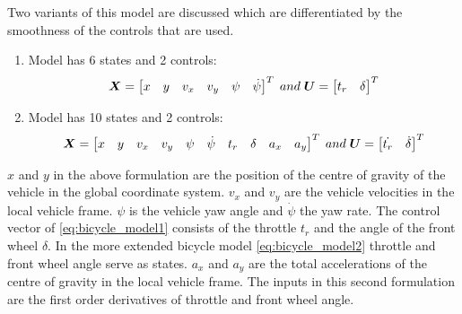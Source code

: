 Two variants of this model are discussed which are differentiated by the smoothness of the controls that are used. 
\begin{enumerate}
	\item	Model has 6 states and 2 controls: 
	\begin{equation}\label{eq:bicycle_model1}
	\centering
	\bm{X} = 
	\begin{bmatrix}
	x & y & v_x & v_y & \psi & \dot{\psi}
	\end{bmatrix}^{T}
	\; and \; \bm{U} = 
	\begin{bmatrix}
	t_r & \delta
	\end{bmatrix}^{T}
	\end{equation}
	
	\item Model has 10 states and 2 controls:
	\begin{equation}\label{eq:bicycle_model2}
	\centering
	\bm{X} = 
	\begin{bmatrix}
	x & y & v_x & v_y & \psi & \dot{\psi} & t_r & \delta & a_x & a_y
	\end{bmatrix}^{T}
	\; and \; \bm{U} = 
	\begin{bmatrix}
	\dot{t_r} & \dot{\delta}
	\end{bmatrix}^{T}
	\end{equation}
\end{enumerate}


$x$ and $y$ in the above formulation are the position of the centre of gravity of the vehicle in the global coordinate system. $v_x$ and $v_y$ are the vehicle velocities in the local vehicle frame. $\psi$ is the vehicle yaw angle and $\dot{\psi}$ the yaw rate.  The control vector of \ref{eq:bicycle_model1} consists of the throttle $t_r$ and the angle of the front wheel $\delta$. In the more extended bicycle model \ref{eq:bicycle_model2} throttle and front wheel angle serve as states. $a_x$ and $a_y$ are the total accelerations of the centre of gravity in the local vehicle frame. The inputs in this second formulation are the first order derivatives of throttle and front wheel angle.\\

